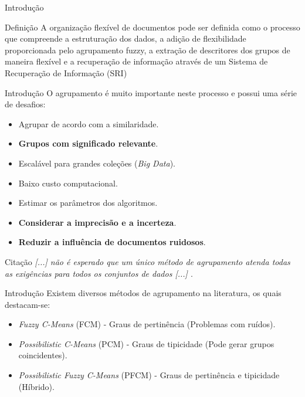 \documentclass[brazil]{beamer}
\begin{document}
\begin{frame}{Introdução}
  \begin{block}{Definição}
    A \alert{organização flexível de documentos} pode ser definida como o processo que compreende a
    \alert{estruturação dos dados}, a adição de flexibilidade proporcionada pelo \alert{agrupamento
    fuzzy}, a \alert{extração de descritores} dos grupos de maneira flexível e a recuperação de
    informação através de um Sistema de Recuperação de Informação (SRI)
  \end{block}
\end{frame}

\begin{frame}{Introdução}
  O agrupamento é muito importante neste processo e possui uma série de desafios:
  \begin{itemize}
    \item Agrupar de acordo com a similaridade. 
    \item \textbf{Grupos com significado relevante}.
    \item Escalável para grandes coleções ({\it Big Data\/}).
    \item Baixo custo computacional.
    \item Estimar os parâmetros dos algoritmos.
    \item \textbf{Considerar a imprecisão e a incerteza}.
    \item \textbf{Reduzir a influência de \alert{documentos ruidosos}}. 
  \end{itemize} 
  \begin{block}{Citação}
    {\it [...] não é esperado que um único método de agrupamento atenda
    todas as exigências para todos os conjuntos de dados [...] \cite{Steinbach2004}\/}.
  \end{block}
\end{frame}

\begin{frame}{Introdução}
  Existem diversos métodos de agrupamento na literatura, os quais destacam-se:
  \begin{itemize}
    \item {\it Fuzzy C-Means\/} (FCM) - Graus de pertinência (Problemas com ruídos). 
    \item {\it Possibilistic C-Means\/} (PCM) - Graus de tipicidade (Pode gerar grupos
      coincidentes). 
    \item {\it Possibilistic Fuzzy C-Means\/} (PFCM) - Graus de pertinência e tipicidade (Híbrido). 
  \end{itemize} 

\end{frame}
\end{document}
